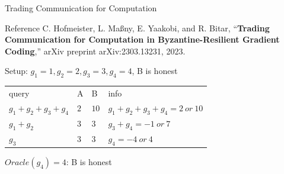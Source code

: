 \documentclass{beamer}
\begin{document}
\begin{frame}{Trading Communication for Computation}
    \begin{block}{Reference}
        C. Hofmeister, L. Maßny, E. Yaakobi, and R. Bitar, “\textbf{Trading Communication for Computation in Byzantine-Resilient Gradient Coding},” arXiv preprint arXiv:2303.13231, 2023.
    \end{block}

    \begin{example}
        Setup: $g_1 = 1, g_2 = 2, g_3 = 3, g_4 = 4$, B is honest
        \begin{table}
            \begin{tabular}{llll}
            query                   & A   & B    & info                             \\
            $g_1 + g_2 + g_3 + g_4$ & $2$ & $10$ & $g_1 + g_2 + g_3 + g_4 = 2\ or\ 10$ \\
            $g_1 + g_2$             & $3$ & $3$  & $g_3 + g_4 = -1\ or\ 7$            \\
            $g_3$                   & $3$ & $3$  & $g_4 = -4\ or\ 4$                 
            \end{tabular}
        \end{table}
        $Oracle(g_4) = 4$: B is honest
    \end{example}
\end{frame}
\end{document}
